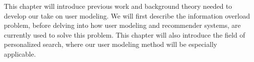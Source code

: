 \label{chap:theory}

This chapter will introduce previous work and background theory needed to develop our take on user modeling.
We will first describe the information overload problem, before delving into
how user modeling and recommender systems, are currently used to solve this problem.
This chapter will also introduce the field of personalized search, 
where our user modeling method will be especially applicable.







 
%



